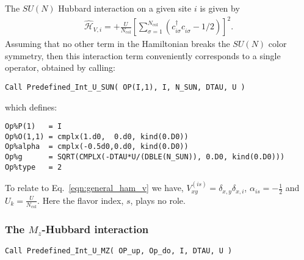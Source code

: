 The $SU(N)$ Hubbard interaction on a given site $i$ is given by 
\begin{align}
\hat{\mathcal{H}}_{V,i} =
+ \frac{U}{N_{\mathrm{col}}}\left[
\sum\limits_{\sigma=1}^{N_{\mathrm{col}}}
\left(  c^{\dagger}_{i \sigma} c^{\phantom\dagger}_{i\sigma}  -1/2 \right) \right]^{2}.
\end{align} 
Assuming that no other term in the Hamiltonian breaks the $SU(N) $ color symmetry, then this interaction term conveniently corresponds to  a single operator, obtained by calling:
\begin{lstlisting}[style=fortran]
Call Predefined_Int_U_SUN( OP(I,1), I, N_SUN, DTAU, U )
\end{lstlisting}
which defines:

\begin{lstlisting}[style=fortran]
Op%P(1)   = I
Op%O(1,1) = cmplx(1.d0,  0.d0, kind(0.D0))
Op%alpha  = cmplx(-0.5d0,0.d0, kind(0.D0))
Op%g      = SQRT(CMPLX(-DTAU*U/(DBLE(N_SUN)), 0.D0, kind(0.D0))) 
Op%type   = 2

\end{lstlisting}

To relate to  Eq.~\eqref{eqn:general_ham_v} we have,   $V_{x y}^{(is)} =  \delta_{x,y} \delta_{x,i}$, $\alpha_{is} = -\frac{1}{2}$ and $U_{k} =  \frac{U}{N_{\mathrm{col}}}$.   Here  the flavor index, $s$,  plays no role. 


\subsubsection{The $M_z$-Hubbard interaction}

\begin{lstlisting}[style=fortran]
Call Predefined_Int_U_MZ( OP_up, Op_do, I, DTAU, U )
\end{lstlisting}

